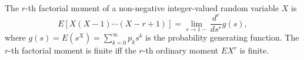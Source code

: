The $r$-th factorial moment of a non-negative integer-valued random variable $X$ is
$$E[X(X-1)\cdots(X-r+1)] = \lim_{s \to 1-} \frac{d^r}{ds^r} g(s),$$
where $g(s) = E(s^X) = \sum_{k=0}^{\infty} p_k s^k$ is the probability generating function. The $r$-th factorial moment is finite iff the $r$-th ordinary moment $EX^r$ is finite.
